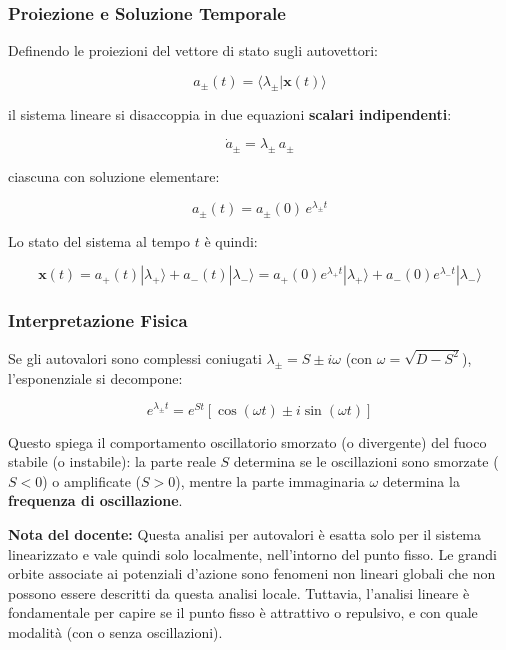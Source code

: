 \subsubsection{Proiezione e Soluzione Temporale}

Definendo le proiezioni del vettore di stato sugli autovettori:

\begin{equation}
a_{\pm}(t) = \langle \lambda_{\pm} | \mathbf{x}(t) \rangle
\end{equation}

il sistema lineare si disaccoppia in due equazioni \textbf{scalari indipendenti}:

\begin{equation}
\dot{a}_{\pm} = \lambda_{\pm} \, a_{\pm}
\end{equation}

ciascuna con soluzione elementare:

\begin{equation}
a_{\pm}(t) = a_{\pm}(0) \, e^{\lambda_{\pm} t}
\end{equation}

Lo stato del sistema al tempo $t$ è quindi:

\begin{equation}
\mathbf{x}(t) = a_+(t) |\lambda_+\rangle + a_-(t) |\lambda_-\rangle = a_+(0) e^{\lambda_+ t} |\lambda_+\rangle + a_-(0) e^{\lambda_- t} |\lambda_-\rangle
\end{equation}

\subsubsection{Interpretazione Fisica}

Se gli autovalori sono complessi coniugati $\lambda_\pm = S \pm i\omega$ (con $\omega = \sqrt{D - S^2}$), l'esponenziale si decompone:

\begin{equation}
e^{\lambda_\pm t} = e^{St} \left[\cos(\omega t) \pm i\sin(\omega t)\right]
\end{equation}

Questo spiega il comportamento oscillatorio smorzato (o divergente) del fuoco stabile (o instabile): la parte reale $S$ determina se le oscillazioni sono smorzate ($S < 0$) o amplificate ($S > 0$), mentre la parte immaginaria $\omega$ determina la \textbf{frequenza di oscillazione}.

\begin{tcolorbox}[colback=gray!5, colframe=gray!40, arc=2mm, boxrule=0.5pt]
\textbf{Nota del docente:} Questa analisi per autovalori è esatta solo per il sistema linearizzato e vale quindi solo localmente, nell'intorno del punto fisso. Le grandi orbite associate ai potenziali d'azione sono fenomeni non lineari globali che non possono essere descritti da questa analisi locale. Tuttavia, l'analisi lineare è fondamentale per capire se il punto fisso è attrattivo o repulsivo, e con quale modalità (con o senza oscillazioni).
\end{tcolorbox}



